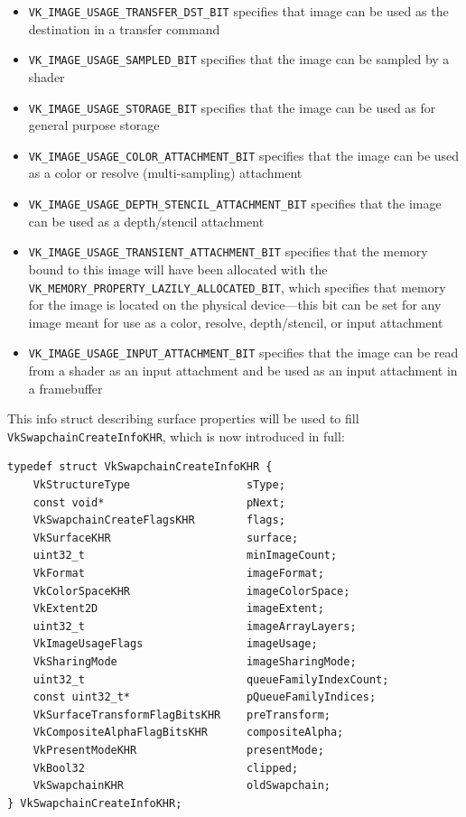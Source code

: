 \documentclass[12pt,letterpaper]{article}
\newcommand{\cil}[1]{\texttt{#1}}
\begin{document}
\begin{itemize}
\begin{itemize}
                \item \cil{VK_IMAGE_USAGE_TRANSFER_DST_BIT} specifies that image can be used as the destination in a transfer command
                
                \item \cil{VK_IMAGE_USAGE_SAMPLED_BIT} specifies that the image can be sampled by a shader
                
                \item \cil{VK_IMAGE_USAGE_STORAGE_BIT} specifies that the image can be used as for general purpose storage
                
                \item \cil{VK_IMAGE_USAGE_COLOR_ATTACHMENT_BIT} specifies that the image can be used as a color or resolve (multi-sampling) attachment
                
                \item \cil{VK_IMAGE_USAGE_DEPTH_STENCIL_ATTACHMENT_BIT} specifies that the image can be used as a depth/stencil attachment
                
                \item \cil{VK_IMAGE_USAGE_TRANSIENT_ATTACHMENT_BIT} specifies that the memory bound to this image will have been allocated with the \cil{VK_MEMORY_PROPERTY_LAZILY_ALLOCATED_BIT}, which specifies that memory for the image is located on the physical device---this bit can be set for any image meant for use as a color, resolve, depth/stencil, or input attachment
                
                \item \cil{VK_IMAGE_USAGE_INPUT_ATTACHMENT_BIT} specifies that the image can be read from a shader as an input attachment and be used as an input attachment in a framebuffer
            \end{itemize}
    \end{itemize}

    This info struct describing surface properties will be used to fill \cil{VkSwapchainCreateInfoKHR}, which is now introduced in full:
    \begin{verbatim}
typedef struct VkSwapchainCreateInfoKHR {
    VkStructureType                  sType;
    const void*                      pNext;
    VkSwapchainCreateFlagsKHR        flags;
    VkSurfaceKHR                     surface;
    uint32_t                         minImageCount;
    VkFormat                         imageFormat;
    VkColorSpaceKHR                  imageColorSpace;
    VkExtent2D                       imageExtent;
    uint32_t                         imageArrayLayers;
    VkImageUsageFlags                imageUsage;
    VkSharingMode                    imageSharingMode;
    uint32_t                         queueFamilyIndexCount;
    const uint32_t*                  pQueueFamilyIndices;
    VkSurfaceTransformFlagBitsKHR    preTransform;
    VkCompositeAlphaFlagBitsKHR      compositeAlpha;
    VkPresentModeKHR                 presentMode;
    VkBool32                         clipped;
    VkSwapchainKHR                   oldSwapchain;
} VkSwapchainCreateInfoKHR;
    \end{verbatim}
    
\end{document}
